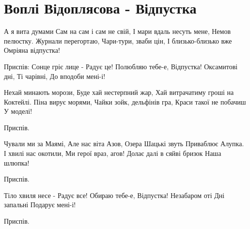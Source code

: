 \section{Воплі Відоплясова - Відпустка}
\begin{guitar}

А я вита думами
Сам на сам і сам не свій,
І мари вдаль несуть мене,
Немов пелюстку.
Журнали перегортаю,
Чари-тури, зваби цін,
І близько-близько вже
Омріяна відпустка!

Приспів:
Сонце гріє лице -
Радує це!
Полюбляю тебе-е,
Відпустка!
Оксамитові дні,
Ті чарівні,
До вподоби мені-і!

Нехай минають морози,
Буде хай нестерпний жар,
Хай витрачатиму гроші на
Коктейлі.
Піна вирує морями,
Чайки зойк, дельфінів гра,
Краси такої не побачиш
У моделі!

Приспів.

Чували ми за Маямі,
Але нас віта Азов,
Озера Шацькі звуть
Приваблює Алупка.
І хвилі нас окотили,
Ми герої враз, агов!
Долає далі в сяйві бризок
Наша шлюпка!

Приспів.

Тіло хвиля несе -
Радує все!
Обираю тебе-е,
Відпустка!
Незабаром  оті
Дні запальні
Подарує мені-і!

Приспів.
\end{guitar}
